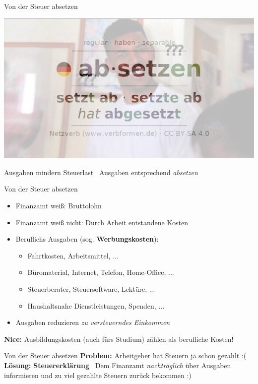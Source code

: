 \documentclass{beamer}
\begin{document}
			\begin{frame}{Von der Steuer absetzen}
				\begin{center}
					\includegraphics[width=0.75\linewidth]{images/absetzen}
				\end{center}
				\pause
				Ausgaben mindern Steuerlast \textrightarrow\ Ausgaben entsprechend \textit{absetzen}
			\end{frame}
		
			\begin{frame}{Von der Steuer absetzen}
				\begin{itemize}
					\item Finanzamt weiß: Bruttolohn
					\item Finanzamt weiß nicht: Durch Arbeit entstandene Kosten
					\pause
					\item Beruflichs Ausgaben (sog. \textbf{Werbungskosten}):
					\begin{itemize}
						\item Fahrtkosten, Arbeitsmittel, ...
						\item Büromaterial, Internet, Telefon, Home-Office, ...
						\item Steuerberater, Steuersoftware, Lektüre, ...
						\item Haushaltsnahe Dienstleistungen, Spenden, ...
					\end{itemize}
					\item Ausgaben reduzieren \textit{zu versteuerndes Einkommen}
				\end{itemize}\n\pause
				
				\textbf{Nice:} Ausbildungskosten (auch fürs Studium) zählen als berufliche Kosten!
			\end{frame}
				
			\begin{frame}{Von der Steuer absetzen}
				\textbf{Problem:} Arbeitgeber hat Steuern ja schon gezahlt :(\n\pause
				\textbf{Lösung:} \textbf{Steuererklärung} \textrightarrow\ Dem Finanzamt \textit{nachträglich} über Ausgaben informieren und zu viel gezahlte Steuern zurück bekommen :)
			\end{frame}
		
\end{document}
